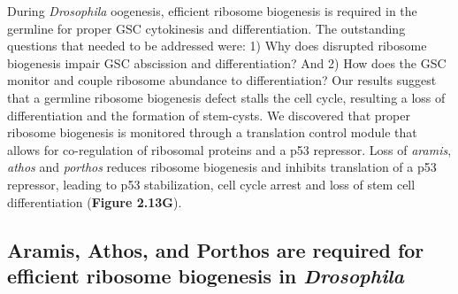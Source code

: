 \documentclass[12pt,oneside]{reedthesis}
\begin{document}
During \emph{Drosophila} oogenesis, efficient ribosome biogenesis is required in the germline for proper GSC cytokinesis and differentiation. The outstanding questions that needed to be addressed were: 1) Why does disrupted ribosome biogenesis impair GSC abscission and differentiation? And 2) How does the GSC monitor and couple ribosome abundance to differentiation? Our results suggest that a germline ribosome biogenesis defect stalls the cell cycle, resulting a loss of differentiation and the formation of stem-cysts. We discovered that proper ribosome biogenesis is monitored through a translation control module that allows for co-regulation of ribosomal proteins and a p53 repressor. Loss of \emph{aramis}, \emph{athos} and \emph{porthos} reduces ribosome biogenesis and inhibits translation of a p53 repressor, leading to p53 stabilization, cell cycle arrest and loss of stem cell differentiation (\textbf{Figure 2.13G}).

\hypertarget{aramis-athos-and-porthos-are-required-for-efficient-ribosome-biogenesis-in-drosophila}{%
\subsection{\texorpdfstring{Aramis, Athos, and Porthos are required for efficient ribosome biogenesis in \emph{Drosophila}}{Aramis, Athos, and Porthos are required for efficient ribosome biogenesis in Drosophila}}\label{aramis-athos-and-porthos-are-required-for-efficient-ribosome-biogenesis-in-drosophila}}
\end{document}
